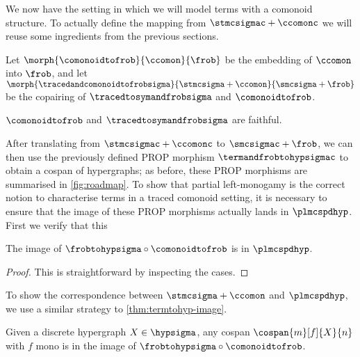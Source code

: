 We now have the setting in which we will model terms with a comonoid structure.
To actually define the mapping from \(\stmcsigmac + \ccomonc\) we will reuse
some ingredients from the previous sections.

\begin{definition}
    Let \(
    \morph{
        \comonoidtofrob
    }{
        \ccomon
    }{
        \frob
    }
    \) be the embedding of \(\ccomon\) into \(\frob\), and let \(
    \morph{
        \tracedandcomonoidtofrobsigma
    }{
        \stmcsigma + \ccomon
    }{
        \smcsigma + \frob
    }
    \) be the copairing of \(\tracedtosymandfrobsigma\) and
    \(\comonoidtofrob\).
\end{definition}

\begin{corollary}
    \(\comonoidtofrob\) and \(\tracedtosymandfrobsigma\) are faithful.
\end{corollary}

After translating from \(\stmcsigmac + \ccomonc\) to \(\smcsigmac + \frob\),
we can then use the previously defined PROP morphism \(\termandfrobtohypsigmac\)
to obtain a cospan of hypergraphs; as before, these PROP morphisms are
summarised in \cref{fig:roadmap}.
To show that partial left-monogamy is the correct notion to characterise terms
in a traced comonoid setting, it is necessary to ensure that the image of these
PROP morphisms actually lands in \(\plmcspdhyp\).
First we verify that this

\begin{lemma}
    The image of \(\frobtohypsigma \circ \comonoidtofrob\) is in
    \(\plmcspdhyp\).
\end{lemma}
\begin{proof}
    This is straightforward by inspecting the cases.
\end{proof}

To show the correspondence between \(\stmcsigma + \ccomon\) and
\(\plmcspdhyp\), we use a similar strategy to \cref{thm:termtohyp-image}.

\begin{lemma}\label{lem:discrete-mono}
    Given a discrete hypergraph \(X \in \hypsigma\), any cospan
    \(\cospan{m}[f]{X}{n}\) with \(f\) mono is in the image of
    \(\frobtohypsigma \circ \comonoidtofrob\).
\end{lemma}

